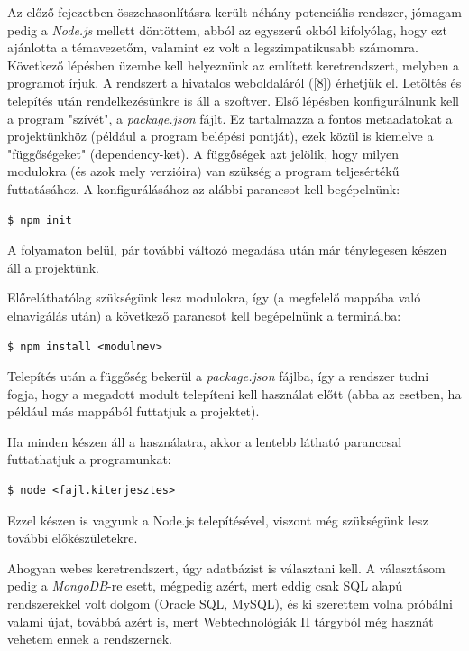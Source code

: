 Az előző fejezetben összehasonlításra került néhány potenciális rendszer, jómagam pedig a \textit{Node.js} mellett döntöttem, abból az egyszerű okból kifolyólag, hogy ezt ajánlotta a témavezetőm, valamint ez volt a legszimpatikusabb számomra. Következő lépésben üzembe kell helyeznünk az említett keretrendszert, melyben a programot írjuk. A rendszert a hivatalos weboldaláról ([8]) érhetjük el. Letöltés és telepítés után rendelkezésünkre is áll a szoftver. Első lépésben konfigurálnunk kell a program "szívét", a \textit{package.json} fájlt. Ez tartalmazza a fontos metaadatokat a projektünkhöz (például a program belépési pontját), ezek közül is kiemelve a "függőségeket" (dependency-ket). A függőségek azt jelölik, hogy milyen modulokra (és azok mely verzióira) van szükség a program teljesértékű futtatásához. A konfigurálásához az alábbi parancsot kell begépelnünk:

\begin{verbatim}
$ npm init
\end{verbatim}

A folyamaton belül, pár további változó megadása után már ténylegesen készen áll a projektünk.

Előreláthatólag szükségünk lesz modulokra, így (a megfelelő mappába való elnavigálás után) a következő parancsot kell begépelnünk a terminálba:

\begin{verbatim}
$ npm install <modulnev>
\end{verbatim}

Telepítés után a függőség bekerül a \textit{package.json} fájlba, így a rendszer tudni fogja, hogy a megadott modult telepíteni kell használat előtt (abba az esetben, ha például más mappából futtatjuk a projektet).

Ha minden készen áll a használatra, akkor a lentebb látható paranccsal futtathatjuk a programunkat:

\begin{verbatim}
$ node <fajl.kiterjesztes>
\end{verbatim}

Ezzel készen is vagyunk a Node.js telepítésével, viszont még szükségünk lesz további előkészületekre.

Ahogyan webes keretrendszert, úgy adatbázist is választani kell. A választásom pedig a \textit{MongoDB}-re esett, mégpedig azért, mert eddig csak SQL alapú rendszerekkel volt dolgom (Oracle SQL, MySQL), és ki szerettem volna próbálni valami újat, továbbá azért is, mert Webtechnológiák II tárgyból még hasznát vehetem ennek a rendszernek.

